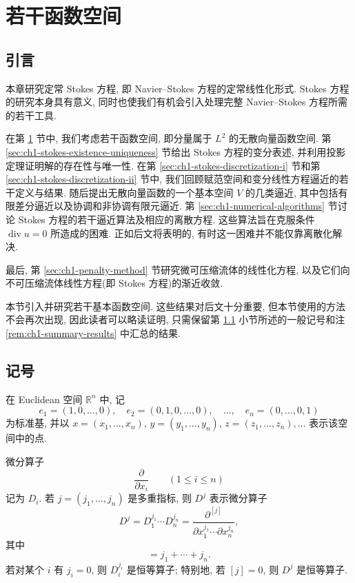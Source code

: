\section{若干函数空间}
\label{sec:ch1-function-spaces}

\subsection*{引言}

本章研究定常 Stokes 方程, 即 Navier--Stokes 方程的定常线性化形式. Stokes 方程的研究本身具有意义, 同时也使我们有机会引入处理完整 Navier--Stokes 方程所需的若干工具.

在第 \ref{sec:ch1-function-spaces} 节中, 我们考虑若干函数空间, 即分量属于 $L^2$ 的无散向量函数空间. 第 \ref{sec:ch1-stokes-existence-uniqueness} 节给出 Stokes 方程的变分表述, 并利用投影定理证明解的存在性与唯一性. 在第 \ref{sec:ch1-stokes-discretization-i} 节和第 \ref{sec:ch1-stokes-discretization-ii} 节中, 我们回顾赋范空间和变分线性方程逼近的若干定义与结果. 随后提出无散向量函数的一个基本空间 $V$ 的几类逼近, 其中包括有限差分逼近以及协调和非协调有限元逼近. 第 \ref{sec:ch1-numerical-algorithms} 节讨论 Stokes 方程的若干逼近算法及相应的离散方程. 这些算法旨在克服条件 $\operatorname{div}u=0$ 所造成的困难. 正如后文将表明的, 有时这一困难并不能仅靠离散化解决.

最后, 第 \ref{sec:ch1-penalty-method} 节研究微可压缩流体的线性化方程, 以及它们向不可压缩流体线性方程(即 Stokes 方程)的渐近收敛.

本节引入并研究若干基本函数空间. 这些结果对后文十分重要, 但本节使用的方法不会再次出现, 因此读者可以略读证明, 只需保留第 \ref{subsec:ch1-notation} 小节所述的一般记号和注 \ref{rem:ch1-summary-results} 中汇总的结果.

\subsection{记号}
\label{subsec:ch1-notation}

在 Euclidean 空间 $\mathbb{R}^n$ 中, 记
\[
e_1=(1,0,\ldots,0),\quad e_2=(0,1,0,\ldots,0),\quad\ldots,\quad e_n=(0,\ldots,0,1)
\]
为标准基, 并以 $x=(x_1,\ldots,x_n)$, $y=(y_1,\ldots,y_n)$, $z=(z_1,\ldots,z_n),\ldots$ 表示该空间中的点.

微分算子
\[
\frac{\partial}{\partial x_i}\qquad(1\leq i\leq n)
\]
记为 $D_i$. 若 $j=(j_1,\ldots,j_n)$ 是多重指标, 则 $D^j$ 表示微分算子
\begin{equation}
D^j=D_1^{j_1}\cdots D_n^{j_n}
=\frac{\partial^{[j]}}{\partial x_1^{j_1}\cdots\partial x_n^{j_n}},
\label{eq:ch1-multi-index-derivative}
\end{equation}
其中
\begin{equation}
[j]=j_1+\cdots+j_n.
\label{eq:ch1-multi-index-order}
\end{equation}
若对某个 $i$ 有 $j_i=0$, 则 $D_i^{j_i}$ 是恒等算子; 特别地, 若 $[j]=0$, 则 $D^j$ 是恒等算子.

